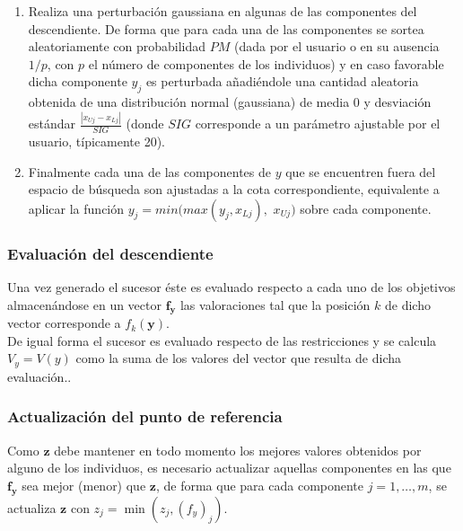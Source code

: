 \begin{enumerate}
        \item Realiza una perturbación gaussiana en algunas de las componentes del descendiente. De forma que para cada una de las componentes se sortea aleatoriamente con probabilidad $PM$ (dada por el usuario o en su ausencia $1/p$, con $p$ el número de componentes de los individuos) y en caso favorable dicha componente $y_j$ es perturbada añadiéndole una cantidad aleatoria obtenida de una distribución normal (gaussiana) de media 0 y desviación estándar $\frac{|x_{Uj} - x_{Lj}|}{SIG}$ (donde $SIG$ corresponde a un parámetro ajustable por el usuario, típicamente 20). \\
        
        \item Finalmente cada una de las componentes de $y$ que se encuentren fuera del espacio de búsqueda son ajustadas a la cota correspondiente, equivalente a aplicar la función $y_j = min(max(y_j ,x_{Lj}),$ $x_{Uj})$ sobre cada componente.\\
        
    \end{enumerate}

\subsubsection{Evaluación del descendiente}

Una vez generado el sucesor éste es evaluado respecto a cada uno de los objetivos almacenándose en un vector $\boldsymbol{f_y}$ las valoraciones tal que la posición $k$ de dicho vector corresponde a $f_k(\boldsymbol{y})$.\\

De igual forma el sucesor es evaluado respecto de las restricciones y se calcula $V_y = V(y)$ como la suma de los valores del vector que resulta de dicha evaluación..\\

\subsubsection{Actualización del punto de referencia}

Como $\boldsymbol{z}$ debe mantener en todo momento los mejores valores obtenidos por alguno de los individuos, es necesario actualizar aquellas componentes en las que $\boldsymbol{f_y}$ sea mejor (menor) que $\boldsymbol{z}$, de forma que para cada componente $j=1, \dots, m$, se actualiza $\boldsymbol{z}$ con $z_j = \min(z_j, (f_y)_j)$. \\

